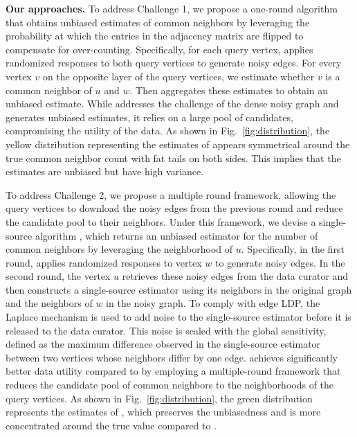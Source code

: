\noindent
{\bf Our approaches.} 
To address Challenge 1, we propose a one-round algorithm \bs that obtains unbiased estimates of common neighbors by leveraging the probability at which the entries in the adjacency matrix are flipped to compensate for over-counting. 
Specifically, for each query vertex, \bs applies randomized responses to both query vertices to generate noisy edges. 
For every vertex $v$ on the opposite layer of the query vertices, we estimate whether $v$ is a common neighbor of $u$ and $w$. 
Then \bs aggregates these estimates to obtain an unbiased estimate. 
While \bs addresses the challenge of the dense noisy graph and generates unbiased estimates, it relies on a large pool of candidates, compromising the utility of the data. 
As shown in Fig.~\ref{fig:distribution}, the yellow distribution representing the estimates of \bs appears symmetrical around the true common neighbor count with fat tails on both sides. 
This implies that the estimates are unbiased but have high variance. 


To address Challenge 2, we propose a multiple round framework, allowing the query vertices to download the noisy edges from the previous round and reduce the candidate pool to their neighbors. 
Under this framework, we devise a single-source algorithm \advss, which returns an unbiased estimator for the number of common neighbors by leveraging the neighborhood of $u$. 
Specifically, in the first round, \advss applies randomized responses to vertex $w$ to generate noisy edges. 
In the second round, the vertex $u$ retrieves these noisy edges from the data curator and then constructs a single-source estimator using its neighbors in the original graph and the neighbors of $w$ in the noisy graph. 
To comply with edge LDP, the Laplace mechanism \cite{dwork2014algorithmic} is used to add noise to the single-source estimator before it is released to the data curator. 
This noise is scaled with the global sensitivity, defined as the maximum difference observed in the single-source estimator between two vertices whose neighbors differ by one edge. 
\advss achieves significantly better data utility compared to \bs by employing a multiple-round framework that reduces the candidate pool of common neighbors to the neighborhoods of the query vertices. 
As shown in Fig.~\ref{fig:distribution}, the green distribution represents the estimates of \advss, which preserves the unbiasedness and is more concentrated around the true value compared to \bs. 

